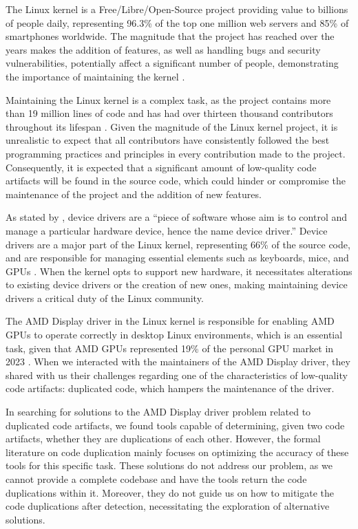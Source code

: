 \en

The Linux kernel is a Free/Libre/Open-Source project providing value to
billions of people daily, representing 96.3\% of the top one million web
servers and 85\% of smartphones worldwide. The magnitude that the project has
reached over the years makes the addition of features, as well as handling bugs
and security vulnerabilities, potentially affect a significant number of
people, demonstrating the importance of maintaining the kernel
\citep{linuxdata}.

Maintaining the Linux kernel is a complex task, as the project contains more
than 19 million lines of code and has had over thirteen thousand contributors
throughout its lifespan \citep{linuxquantity}. Given the magnitude of the Linux
kernel project, it is unrealistic to expect that all contributors have
consistently followed the best programming practices and principles in every
contribution made to the project. Consequently, it is expected that a
significant amount of low-quality code artifacts will be found in the source
code, which could hinder or compromise the maintenance of the project and the
addition of new features.

As stated by \citet{driverdef}, device drivers are a ``piece of software whose
aim is to control and manage a particular hardware device, hence the name
device driver.'' Device drivers are a major part of the Linux kernel,
representing 66\% of the source code, and are responsible for managing
essential elements such as keyboards, mice, and GPUs \citep{marcelo}. When the
kernel opts to support new hardware, it necessitates alterations to existing
device drivers or the creation of new ones, making maintaining device drivers a
critical duty of the Linux community.

The AMD Display driver in the Linux kernel is responsible for enabling AMD GPUs
to operate correctly in desktop Linux environments, which is an essential task,
given that AMD GPUs represented 19\% of the personal GPU market in 2023
\citep{gpumarket}. When we interacted with the maintainers of the AMD Display
driver, they shared with us their challenges regarding one of the
characteristics of low-quality code artifacts: duplicated code, which hampers
the maintenance of the driver.

In searching for solutions to the AMD Display driver problem related to
duplicated code artifacts, we found tools capable of determining, given two
code artifacts, whether they are duplications of each other. However, the
formal literature on code duplication mainly focuses on optimizing the accuracy
of these tools for this specific task. These solutions do not address our
problem, as we cannot provide a complete codebase and have the tools return the
code duplications within it. Moreover, they do not guide us on how to mitigate
the code duplications after detection, necessitating the exploration of
alternative solutions.

